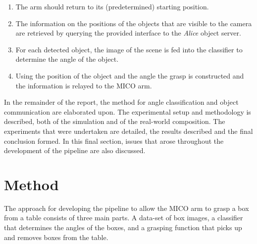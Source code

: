 \documentclass[letterpaper, 10 pt, conference]{conf/ieeeconf}  %
\begin{document}
\begin{enumerate}
\item The arm should return to its (predetermined) starting position.
\item The information on the positions of the objects that are visible to the camera are retrieved by querying the provided interface to the \textit{Alice} object server.
\item For each detected object, the image of the scene is fed into the classifier to determine the angle of the object.
\item Using the position of the object and the angle the grasp is constructed and the information is relayed to the MICO arm.
\end{enumerate}

In the remainder of the report, the method for angle classification and object communication are elaborated upon. The experimental setup and methodology is described, both of the simulation and of the real-world composition. The experiments that were undertaken are detailed, the results described and the final conclusion formed. In this final section, issues that arose throughout the development of the pipeline are also discussed.




\section{Method}

The approach for developing the pipeline to allow the MICO arm to grasp a box
from a table consists of three main parts. A data-set of box images, a
classifier that determines the angles of the boxes, and a grasping function that
picks up and removes boxes from the table.
\end{document}
